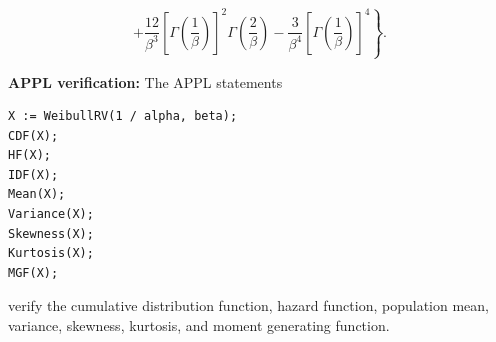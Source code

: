 \documentclass[12pt,fullpage]{article}
\begin{document}
\vspace{-0.1 in}

\begin{small}
$$
\left.
+ \frac {12}{\beta^3} \left[ \Gamma \left( \frac{1}{\beta} \right) \right]^2 \Gamma \left( \frac{2}{\beta} \right) - \frac{3}{\beta^4}
\left[ \Gamma \left(\frac{1}{\beta}\right)\right]^4 \right\}.
$$
\end{small}

\vspace{0.1in}

\noindent
{\bf APPL verification:}
The APPL statements
\begin{verbatim}
X := WeibullRV(1 / alpha, beta);
CDF(X);
HF(X);
IDF(X);
Mean(X);
Variance(X);
Skewness(X);
Kurtosis(X);
MGF(X);
\end{verbatim}
verify the cumulative distribution function, hazard function, population mean, variance, skewness, kurtosis, and moment generating function.
\end{document}
